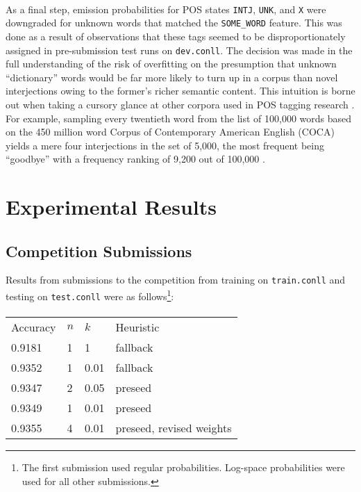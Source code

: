 \documentclass[11pt,a4paper]{article}
\begin{document}
\paragraph{}
As a final step, emission probabilities for POS states \texttt{INTJ}, \texttt{UNK},
and \texttt{X} were downgraded for unknown words that matched the \texttt{SOME\_WORD}
feature. This was done as a result of observations that these tags seemed to be
disproportionately assigned in pre-submission test runs on \texttt{dev.conll}.
The decision was made in the full understanding of the risk of overfitting on the
presumption that unknown ``dictionary'' words would be far more likely to turn up
in a corpus than novel interjections owing to the former's richer semantic content.
This intuition is borne out when taking a cursory glance at other corpora \cite{WFD100K}
used in POS tagging research \cite{CLAWS7} \cite{BrysbaertNewKeuleers}. For example,
sampling every twentieth word from the list of 100,000 words based on the 450 million word
Corpus of Contemporary American English (COCA) yields a mere four interjections in the set of
5,000, the most frequent being ``goodbye'' with a frequency ranking of 9,200 out of 100,000 \cite{COCA5K}.

\section{Experimental Results}

\subsection{Competition Submissions}
Results from submissions to the competition from training on \texttt{train.conll}
and testing on \texttt{test.conll} were as follows\footnote{The first submission used regular probabilities. Log-space probabilities were used for all other submissions.}:

\paragraph{}
{\small
\begin{tabular}{llll}
  Accuracy & $n$ & $k$ & Heuristic \\
  0.9181 & 1 & 1 & fallback \\
  0.9352 & 1 & 0.01 & fallback \\
  0.9347 & 2 & 0.05 & preseed \\
  0.9349 & 1 & 0.01 & preseed \\
  0.9355 & 4 & 0.01 & preseed, revised weights
\end{tabular}}
\end{document}
